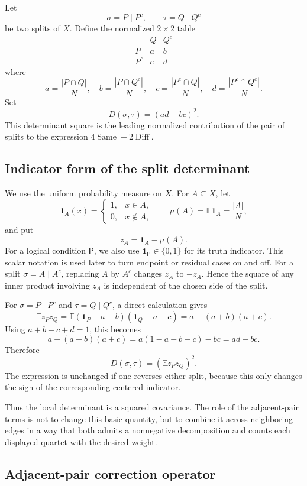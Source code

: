 \documentclass[11pt]{article}
\newcommand{\Same}{\operatorname{Same}}
\newcommand{\Diff}{\operatorname{Diff}}
\newcommand{\ind}{\mathbf 1}
\newcommand{\E}{\mathbb E}
\begin{document}
Let
\[
\sigma=P\mid P^c,
\qquad
\tau=Q\mid Q^c
\]
be two splits of $X$.  Define the normalized $2\times2$ table
\[
\begin{array}{c|cc}
&Q&Q^c\\
\hline
P&a&b\\
P^c&c&d
\end{array}
\]
where
\[
a=\frac{|P\cap Q|}{N},\quad
b=\frac{|P\cap Q^c|}{N},\quad
c=\frac{|P^c\cap Q|}{N},\quad
d=\frac{|P^c\cap Q^c|}{N}.
\]
Set
\[
D(\sigma,\tau)=(ad-bc)^2.
\]
This determinant square is the leading normalized contribution of the pair of splits to the expression $4\Same-2\Diff$.

\subsection{Indicator form of the split determinant}

We use the uniform probability measure on $X$.  For $A\subseteq X$, let
\[
\ind_A(x)=
\begin{cases}
1,&x\in A,\\
0,&x\notin A,
\end{cases}
\qquad
\mu(A)=\E\ind_A=\frac{|A|}{N},
\]
and put
\[
z_A=\ind_A-\mu(A).
\]
For a logical condition $\mathsf P$, we also use
$\mathbf 1_{\mathsf P}\in\{0,1\}$ for its truth indicator.  This scalar
notation is used later to turn endpoint or residual cases on and off.
For a split $\sigma=A\mid A^c$, replacing $A$ by $A^c$ changes $z_A$ to $-z_A$.  Hence the square of any inner product involving $z_A$ is independent of the chosen side of the split.

For $\sigma=P\mid P^c$ and $\tau=Q\mid Q^c$, a direct calculation gives
\[
\E z_Pz_Q
=
\E(\ind_P-a-b)(\ind_Q-a-c)
=a-(a+b)(a+c).
\]
Using $a+b+c+d=1$, this becomes
\[
a-(a+b)(a+c)=a(1-a-b-c)-bc=ad-bc.
\]
Therefore
\[
D(\sigma,\tau)=\left(\E z_Pz_Q\right)^2.
\]
The expression is unchanged if one reverses either split, because this only
changes the sign of the corresponding centered indicator.

Thus the local determinant is a squared covariance.  The role of the
adjacent-pair terms is not to change this basic quantity, but to combine it
across neighboring edges in a way that both admits a nonnegative
decomposition and counts each displayed quartet with the desired weight.


\subsection{Adjacent-pair correction operator}\label{subsec:adjacent-pair-correction}
\end{document}
